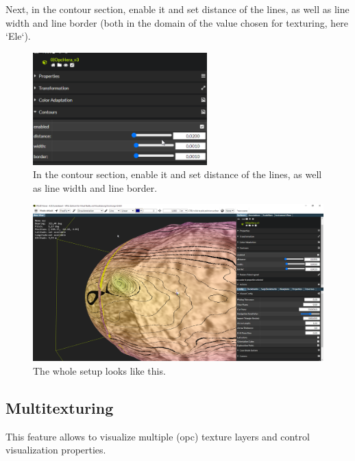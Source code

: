 Next, in the contour section, enable it and set distance of the lines, as well as line width and line border (both in the domain of the value chosen for texturing, here `Ele`).

\begin{figure}[h!]
	\centering
	\includegraphics[width=0.6\textwidth]{pics/contour1.png}
	\caption{In the contour section, enable it and set distance of the lines, as well as line width and line border.}
\end{figure}

\begin{figure}[h!]
	\centering
	\includegraphics[width=1.0\textwidth]{pics/contour0.png}
	\caption{The whole setup looks like this.}
\end{figure}


\clearpage

\subsection{Multitexturing}
\label{sec:multitexturing}

This feature allows to visualize multiple (opc) texture layers and control visualization properties.

